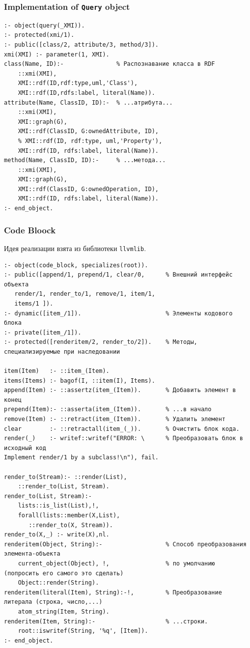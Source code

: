 \documentclass[10pt]{beamer}
\begin{document}
\begin{frame}[fragile]
  \frametitle{Implementation of \texttt{Query} object}
\begin{verbatim}
:- object(query(_XMI)).
:- protected(xmi/1).
:- public([class/2, attribute/3, method/3]).
xmi(XMI) :- parameter(1, XMI).
class(Name, ID):-               % Распознавание класса в RDF
    ::xmi(XMI),
    XMI::rdf(ID,rdf:type,uml,'Class'),
    XMI::rdf(ID,rdfs:label, literal(Name)).
attribute(Name, ClassID, ID):-  % ...атрибута...
    ::xmi(XMI),
    XMI::graph(G),
    XMI::rdf(ClassID, G:ownedAttribute, ID),
    % XMI::rdf(ID, rdf:type, uml,'Property'),
    XMI::rdf(ID, rdfs:label, literal(Name)).
method(Name, ClassID, ID):-     % ...метода...
    ::xmi(XMI),
    XMI::graph(G),
    XMI::rdf(ClassID, G:ownedOperation, ID),
    XMI::rdf(ID, rdfs:label, literal(Name)).
:- end_object.
\end{verbatim}
\end{frame}

\begin{frame}[fragile]
  \frametitle{Code Bloock}
  Идея реализации взята из библиотеки \verb|llvmlib|.
\begin{verbatim}
:- object(code_block, specializes(root)).
:- public([append/1, prepend/1, clear/0,      % Внешний интерфейс объекта
   render/1, render_to/1, remove/1, item/1,
   items/1 ]).
:- dynamic([item_/1]).                        % Элементы кодового блока
:- private([item_/1]).
:- protected([renderitem/2, render_to/2]).    % Методы, специализируемые при наследовании

item(Item)   :- ::item_(Item).
items(Items) :- bagof(I, ::item(I), Items).
append(Item) :- ::assertz(item_(Item)).       % Добавить элемент в конец
prepend(Item):- ::asserta(item_(Item)).       % ...в начало
remove(Item) :- ::retract(item_(Item)).       % Удалить элемент
clear        :- ::retractall(item_(_)).       % Очистить блок кода.
render(_)    :- writef::writef("ERROR: \      % Преобразовать блок в исходный код
Implement render/1 by a subclass!\n"), fail.

render_to(Stream):- ::render(List),
    ::render_to(List, Stream).
render_to(List, Stream):-
    lists::is_list(List),!,
    forall(lists::member(X,List),
       ::render_to(X, Stream)).
render_to(X,_) :- write(X),nl.
renderitem(Object, String):-                  % Способ преобразования элемента-объекта
    current_object(Object), !,                % по умолчанию (попросить его самого это сделать)
    Object::render(String).
renderitem(literal(Item), String):-!,         % Преобразование литерала (строка, число,...)
    atom_string(Item, String).
renderitem(Item, String):-                    % ...строки.
    root::iswritef(String, '%q', [Item]).
:- end_object.
\end{verbatim}
\end{frame}
\end{document}
